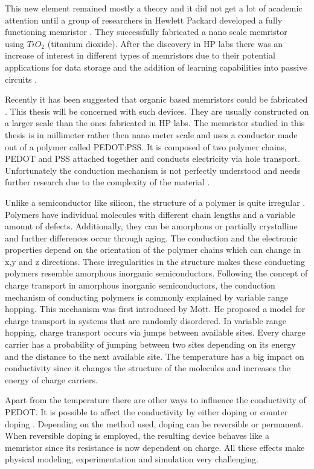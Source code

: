 \begin{doublespace}
This new element remained mostly a theory and it did not get a lot of academic attention until a group of researchers in Hewlett Packard developed a fully functioning memristor \cite{MisMem}. They successfully fabricated a nano scale memristor using $TiO_2$ (titanium dioxide). After the discovery in HP labs there was an increase of interest in different types of memristors due to their potential applications for data storage and the addition of learning capabilities into passive circuits \cite{AdaptiveMem} \cite{Synapse} \cite{CMOS}. 

Recently it has been suggested that organic based memristors could be fabricated \cite{OrganicMem}. This thesis will be concerned with such devices. They are usually constructed on a larger scale than the ones fabricated in HP labs. The memristor studied in this thesis is in millimeter rather then nano meter scale and uses a conductor made out of a polymer called PEDOT:PSS. It is composed of two polymer chains, PEDOT and PSS attached together and conducts electricity via hole transport. Unfortunately the conduction mechanism is not perfectly understood and needs further research due to the complexity of the material \cite{PedotBook}.

Unlike a semiconductor like silicon, the structure of a polymer is quite irregular \cite{PedotBook}. Polymers have individual molecules with different chain lengths and a variable amount of defects. Additionally, they can be amorphous or partially crystalline and further differences occur through aging. The conduction and the electronic properties depend on the orientation of the polymer chains which can change in x,y and z directions. These irregularities in the structure makes these conducting polymers resemble amorphous inorganic semiconductors. Following the concept of charge transport in amorphous inorganic semiconductors, the conduction mechanism of conducting polymers is commonly explained by variable range hopping. This mechanism was first introduced by Mott\cite{Mott}. He proposed a model for charge transport in systems that are randomly disordered. In variable range hopping, charge transport occurs via jumps between available sites. Every charge carrier has a probability of jumping between two sites depending on its energy and the distance to the next available site. The temperature has a big impact on conductivity since it changes the structure of the molecules and increases the energy of charge carriers.

Apart from the temperature there are other ways to influence the conductivity of PEDOT. It is possible to affect the conductivity by either doping or counter doping \cite{PedotDope}. Depending on the method used, doping can be reversible or permanent. When reversible doping is employed, the resulting device behaves like a memristor since its resistance is now dependent on charge. All these effects make physical modeling, experimentation and simulation very challenging. 


\end{doublespace}
